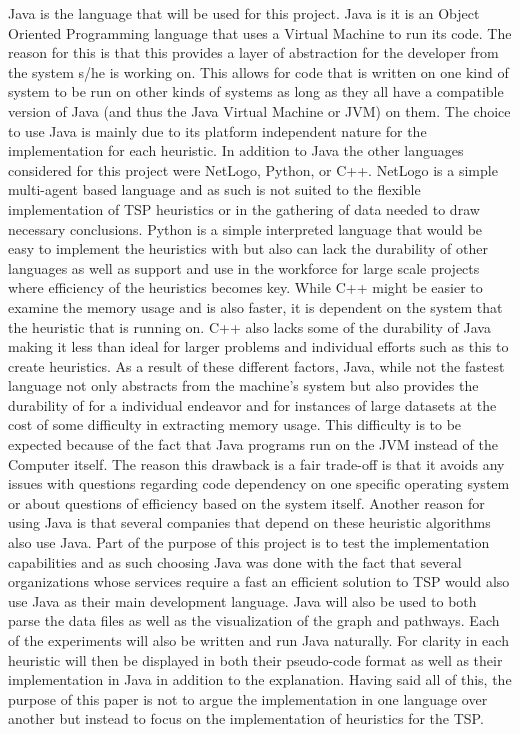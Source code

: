 \documentclass[midd]{thesis}
\newcommand{\tab}{\hspace*{2em}}
\begin{document}
\tab Java is the language that will be used for this project. Java is it is an Object Oriented Programming language that uses a Virtual Machine to run its code. The reason for this is that this provides a layer of abstraction for the developer from the system s/he is working on. This allows for code that is written on one kind of system to be run on other kinds of systems as long as they all have a compatible version of Java (and thus the Java Virtual Machine or JVM) on them. The choice to use Java is mainly due to its platform independent nature for the implementation for each heuristic. In addition to Java the other languages considered for this project were NetLogo, Python, or C++. NetLogo is a simple multi-agent based language and as such is not suited to the flexible implementation of TSP heuristics or in the gathering of data needed to draw necessary conclusions. Python is a simple interpreted language that would be easy to implement the heuristics with but also can lack the durability of other languages as well as support and use in the workforce for large scale projects where efficiency of the heuristics becomes key.  While C++ might be easier to examine the memory usage and is also faster, it is dependent on the system that the heuristic that is running on. C++ also lacks some of the durability of Java making it less than ideal for larger problems and individual efforts such as this to create heuristics. As a result of these different factors, Java, while not the fastest language not only abstracts from the machine's system but also provides the durability of for a individual endeavor and for instances of large datasets at the cost of some difficulty in extracting memory usage. This difficulty is to be expected because of the fact that Java programs run on the JVM instead of the Computer itself. The reason this drawback is a fair trade-off is that it avoids any issues with questions regarding code dependency on one specific operating system or about questions of efficiency based on the system itself. Another reason for using Java is that several companies that depend on these heuristic algorithms also use Java. Part of the purpose of this project is to test the implementation capabilities and as such choosing Java was done with the fact that several organizations whose services require a fast an efficient solution to TSP would also use Java as their main development language. Java will also be  used to both parse the data files as well as the visualization of the graph and pathways. Each of the experiments will also be written and run Java naturally. For clarity in each heuristic will then  be displayed in both their pseudo-code format as well as their implementation in Java in addition to the  explanation. Having said all of this, the purpose of this paper is not to argue the implementation in one language over another but instead to focus on the implementation of heuristics for the TSP.\\
\end{document}
